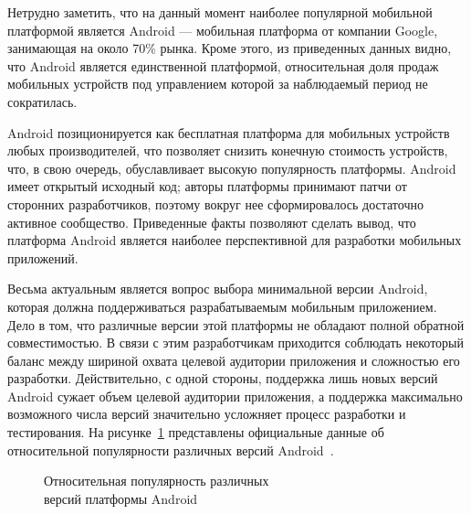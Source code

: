 Нетрудно заметить, что на данный момент наиболее популярной мобильной платформой
является Android --- мобильная платформа от компании Google,
занимающая на около 70\% рынка.
Кроме этого, из приведенных данных видно, что Android является единственной
платформой, относительная доля продаж мобильных устройств под управлением которой
за наблюдаемый период не сократилась.

Android позиционируется как бесплатная платформа для мобильных устройств любых
производителей, что позволяет снизить конечную стоимость устройств,
что, в свою очередь, обуславливает высокую популярность платформы.
Android имеет открытый исходный код; авторы платформы
принимают патчи от сторонних разработчиков,
поэтому вокруг нее сформировалось достаточно активное сообщество.
Приведенные факты позволяют сделать вывод, что платформа Android является наиболее
перспективной для разработки мобильных приложений.

Весьма актуальным является вопрос выбора минимальной версии Android,
которая должна поддерживаться разрабатываемым мобильным приложением.
Дело в том, что различные версии этой платформы не обладают
полной обратной совместимостью. В связи с этим разработчикам приходится
соблюдать некоторый баланс между шириной охвата целевой аудитории приложения
и сложностью его разработки.
Действительно, с одной стороны, поддержка лишь новых версий Android сужает объем
целевой аудитории приложения, а поддержка максимально возможного числа версий
значительно усложняет процесс разработки и тестирования.
На рисунке~\ref{fig:spec_stat_android} представлены официальные
данные об относительной популярности различных версий
Android~\cite{google_stat_android}.

\begin{figure}[h!]
  \centering
  \caption{Относительная популярность различных \\ версий платформы Android}
  \label{fig:spec_stat_android}
\end{figure}

